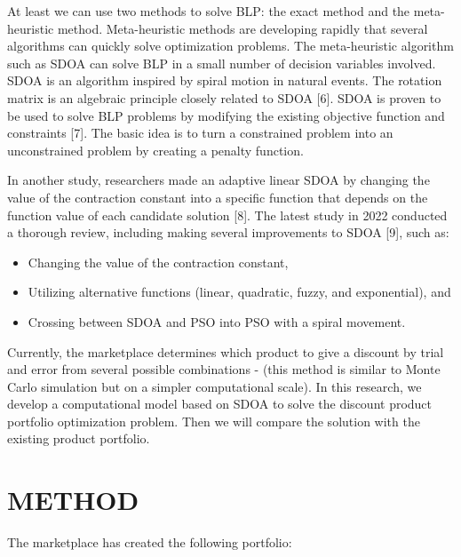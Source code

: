 \documentclass[
]{article}
\providecommand{\tightlist}{%
  \setlength{\itemsep}{0pt}\setlength{\parskip}{0pt}}
\begin{document}
At least we can use two methods to solve BLP: the exact method and the
meta-heuristic method. Meta-heuristic methods are developing rapidly
that several algorithms can quickly solve optimization problems. The
meta-heuristic algorithm such as SDOA can solve BLP in a small number of
decision variables involved. SDOA is an algorithm inspired by spiral
motion in natural events. The rotation matrix is an algebraic principle
closely related to SDOA {[}6{]}. SDOA is proven to be used to solve BLP
problems by modifying the existing objective function and constraints
{[}7{]}. The basic idea is to turn a constrained problem into an
unconstrained problem by creating a penalty function.

In another study, researchers made an adaptive linear SDOA by changing
the value of the contraction constant into a specific function that
depends on the function value of each candidate solution {[}8{]}. The
latest study in 2022 conducted a thorough review, including making
several improvements to SDOA {[}9{]}, such as:

\begin{itemize}
\tightlist
\item
  Changing the value of the contraction constant,
\item
  Utilizing alternative functions (linear, quadratic, fuzzy, and
  exponential), and
\item
  Crossing between SDOA and PSO into PSO with a spiral movement.
\end{itemize}

Currently, the marketplace determines which product to give a discount
by trial and error from several possible combinations - (this method is
similar to Monte Carlo simulation but on a simpler computational scale).
In this research, we develop a computational model based on SDOA to
solve the discount product portfolio optimization problem. Then we will
compare the solution with the existing product portfolio.

\hypertarget{method}{%
\section{METHOD}\label{method}}

The marketplace has created the following portfolio:
\end{document}

